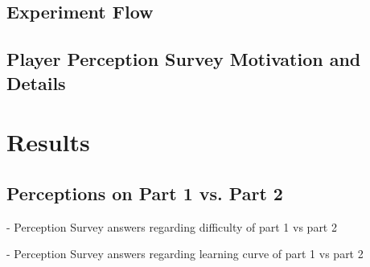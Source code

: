 
\subsection{Experiment Flow}


\subsection{Player Perception Survey Motivation and Details}


\section{Results}





\subsection{Perceptions on Part 1 vs. Part 2}

- Perception Survey answers regarding difficulty of part 1 vs part 2

- Perception Survey answers regarding learning curve of part 1 vs part 2

